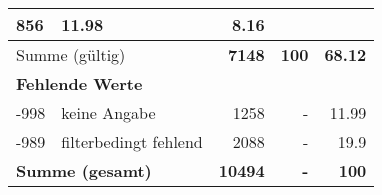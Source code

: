 \begin{longtable}{lXrrr}
       \num{856} &
       \num[round-mode=places,round-precision=2]{11,98} &
         \num[round-mode=places,round-precision=2]{8,16} \\
     \midrule
     \multicolumn{2}{l}{Summe (gültig)} &
       \textbf{\num{7148}} &
     \textbf{100} &
       \textbf{\num[round-mode=places,round-precision=2]{68,12}} \\
     \multicolumn{5}{l}{\textbf{Fehlende Werte}}\\
       -998 &
       keine Angabe &
         \num{1258} &
        - &
         \num[round-mode=places,round-precision=2]{11,99} \\
       -989 &
       filterbedingt fehlend &
         \num{2088} &
        - &
         \num[round-mode=places,round-precision=2]{19,9} \\
     \midrule
     \multicolumn{2}{l}{\textbf{Summe (gesamt)}} &
          \textbf{\num{10494}} &
        \textbf{-} &
        \textbf{100} \\
     \bottomrule
     \end{longtable}
     
